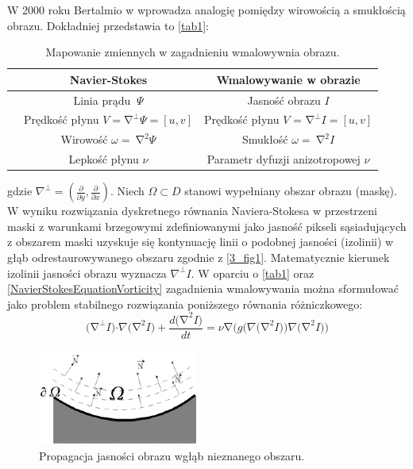 \documentclass[12pt, twoside, openany]{report}
\theoremstyle{definition}
\begin{document}
\par
W 2000 roku Bertalmio w \cite{BertalmioNavierStokes} wprowadza analogię pomiędzy wirowością a smukłością obrazu. Dokładniej przedstawia to \autoref{tab1}:
\begin{table}[!h]
	\centering
	\begin{tabular}{|cc|c|}
	\hline \hline

		& Navier-Stokes
		& Wmalowywanie w obrazie\\ \hline
		
		& Linia prądu $\ \mathit{\Psi}$ &  Jasność obrazu $I$ \\ \hline
	
		& Prędkość płynu $V = {\mathrm{\nabla }}^{\bot }\mathit{\Psi} = [u, v]$  & Prędkość płynu $V$ = ${\mathrm{\nabla }}^{\bot }I = [u, v]$ \\ \hline
		& Wirowość $\omega =\ {\mathrm{\nabla }}^2\mathit{\Psi}$ & Smukłość $\omega =\ {\mathrm{\nabla }}^2I$ \\ \hline
		
		& Lepkość płynu $\nu $ & Parametr dyfuzji anizotropowej $\nu $ \\
	\hline
	\end{tabular}
	\caption{Mapowanie zmiennych w zagadnieniu wmalowywnia obrazu.}
	\label{tab1}
\end{table}
gdzie ${\nabla }^{\bot }=(\frac{\partial }{\partial y},\frac{\partial }{\partial x})$.
Niech $\mathit{\Omega}\subset D$ stanowi wypełniany obszar obrazu (maskę). W wyniku rozwiązania dyskretnego równania Naviera-Stokesa w przestrzeni maski z warunkami brzegowymi zdefiniowanymi jako jasność pikseli sąsiadujących z obszarem maski uzyskuje się kontynuację linii o podobnej jasności (izolinii) w głąb odrestaurowywanego obszaru zgodnie z \autoref{3_fig1}.  Matematycznie kierunek izolinii jasności obrazu wyznacza ${\nabla }^{\bot }I$. W oparciu o \autoref{tab1} oraz \eqref{NavierStokesEquationVorticity} zagadnienia wmalowywania można sformułować jako problem stabilnego rozwiązania poniższego równania różniczkowego:
\begin{equation}
{\mathrm{(}\mathrm{\nabla }}^{\mathrm{\bot }}I\mathrm{)}\mathrm{\cdot }\nabla {\mathrm{(}\mathrm{\nabla }}^{\mathrm{2}}I\mathrm{)+}\frac{d{\mathrm{(}\mathrm{\nabla }}^{\mathrm{2}}I\mathrm{)}}{dt}\mathrm{=}\nu \mathrm{\nabla }\mathrm{(}g\mathrm{(}\nabla {\mathrm{(}\mathrm{\nabla }}^{\mathrm{2}}I\mathrm{))}\nabla {\mathrm{(}\mathrm{\nabla }}^{\mathrm{2}}I\mathrm{))} 
\label{NavierStokesInpainting}
\end{equation}
\begin{figure}[!h]
	\centering
	\includegraphics[scale=1]{rysunki/3_fig1}
	\caption{Propagacja jasności obrazu wgłąb nieznanego obszaru.}
	\label{3_fig1}
\end{figure}
\end{document}
